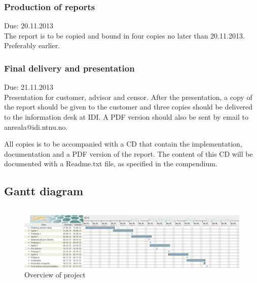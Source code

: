 \documentclass[11pt]{book}
\begin{document}
\subsubsection{Production of reports}
Due: 20.11.2013\\
The report is to be copied and bound in four copies no later than 20.11.2013. Preferably earlier.

\subsubsection{Final delivery and presentation}
Due: 21.11.2013\\
Presentation for customer, advisor and censor. After the presentation, a copy of the report should be given to the customer and three copies should be delivered to the information desk at IDI. A PDF version should also be sent by email to anreala@idi.ntnu.no.

All copies is to be accompanied with a CD that contain the implementation, documentation and a PDF version of the report. The content of this CD will be documented with a Readme.txt file, as specified in the compendium.

\subsection{Gantt diagram}
\begin{figure}[H]
      \centering
      \includegraphics[width=1.0\textwidth]{Figures/gantt.jpg}
      \caption{Overview of project}
      \label{fig:plan_gantt}
\end{figure}
\end{document}
